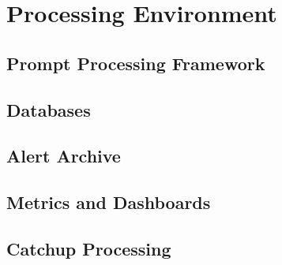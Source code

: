 \section{Processing Environment}


\subsection{Prompt Processing Framework} \label{sec:pp}

\subsection{Databases} \label{sec:db}

\subsection{Alert Archive}

\subsection{Metrics and Dashboards}

\subsection{Catchup Processing}